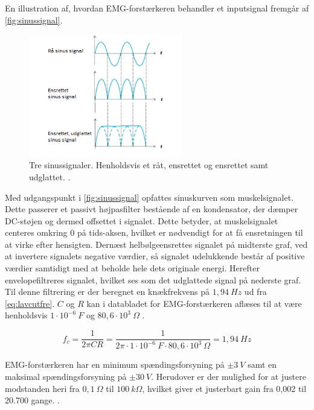En illustration af, hvordan EMG-forstærkeren behandler et inputsignal fremgår af \autoref{fig:sinussignal}.
\begin{figure}[H]
\centering
\includegraphics[width=0.6\textwidth]{figures/sinussignal.png}
\caption{Tre sinussignaler. Henholdsvis et råt, ensrettet og ensrettet samt udglattet. \citep{advancertech2013}.}
\label{fig:sinussignal}
\end{figure}

\noindent
Med udgangspunkt i \autoref{fig:sinussignal} opfattes sinuskurven som muskelsignalet. Dette passerer et passivt højpasfilter bestående af en kondensator, der dæmper DC-støjen og dermed offsettet i signalet. Dette betyder, at muskelsignalet centeres omkring 0 på tids-aksen, hvilket er nødvendigt for at få ensretningen til at virke efter hensigten. Dernæst helbølgeensrettes signalet på midterste graf, ved at invertere signalets negative værdier, så signalet udelukkende består af positive værdier samtidigt med at beholde hele dets originale energi. Herefter envelopefiltreres signalet, hvilket ses som det udglattede signal på nederste graf. Til denne filtrering er der beregnet en knækfrekvens på $1,94~Hz$ ud fra \autoref{eq:lavcutfre}. $C$ og $R$ kan i databladet for EMG-forstærkeren aflæses til at være henholdsvis $1 \cdot 10^{-6}~F$ og $80,6 \cdot 10^3~\Omega$ \citep{advancertech2013}. 


\begin{equation}\label{eq:lavcutfre}
f_c = \frac{1}{2 \pi C R} = \frac{1}{2 \pi \cdot 1 \cdot 10^{-6}~F \cdot 80,6 \cdot 10^3~\Omega} = 1,94~Hz
\end{equation}

EMG-forstærkeren har en minimum spændingsforsyning på $\pm 3~V$ samt en maksimal spændingsforsyning på $\pm 30~V$. Herudover er der mulighed for at justere modstanden heri fra $0,1~\Omega$ til $100~k\Omega$, hvilket giver et justerbart gain fra 0,002 til 20.700 gange. \citep{advancertech2013}. 





